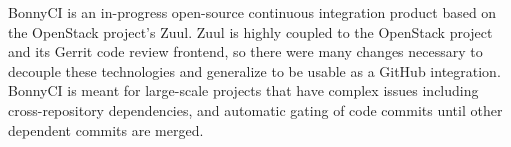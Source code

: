 {
  BonnyCI is an in-progress open-source continuous integration product based on the OpenStack project's Zuul. Zuul is highly coupled to the OpenStack project and its Gerrit code review frontend, so there were many changes necessary to decouple these technologies and generalize to be usable as a GitHub integration. BonnyCI is meant for large-scale projects that have complex issues including cross-repository dependencies, and automatic gating of code commits until other dependent commits are merged.}
